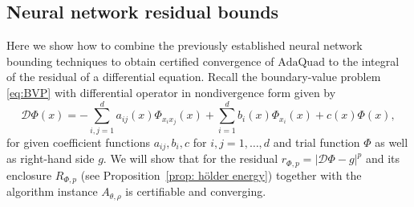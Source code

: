 \documentclass[a4paper, 11pt]{article}
\begin{document}
	
	
	
	\subsection{Neural network residual bounds}
	
	Here we show how to combine the previously established neural network bounding techniques to obtain certified convergence of $\mathrm{AdaQuad}$ to the integral of the residual of a differential equation. Recall the boundary-value problem \eqref{eq:BVP} with differential operator in nondivergence form given by
	\begin{equation*}
		\mathcal{D}\Phi(x) = - \sum_{i,j=1}^d a_{ij}(x) \Phi_{x_i x_j}(x)  + \sum_{i=1}^d b_i(x) \Phi_{x_i}(x) + c(x)\Phi(x),
	\end{equation*}
	for given coefficient functions $a_{ij}, b_i,c$ for $i,j=1, \dotsc, d$ and trial function $\Phi$ as well as right-hand side $g$. We will show that for the residual $r_{\Phi,p}=|\mathcal{D}\Phi - g|^p$ and its enclosure $R_{\Phi, p}$ (see Proposition~\ref{prop: hölder energy}) together with the algorithm instance $A_{\theta,\rho}$ is certifiable and converging.
	
\end{document}
